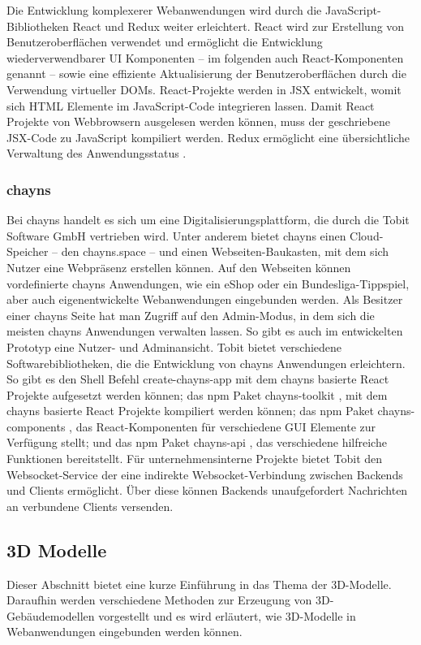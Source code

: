 Die Entwicklung komplexerer Webanwendungen wird durch die JavaScript-Bibliotheken React und Redux weiter erleichtert. React wird zur Erstellung von Benutzeroberflächen verwendet und ermöglicht die Entwicklung wiederverwendbarer \ac{UI} Komponenten – im folgenden auch React-Komponenten genannt – sowie eine effiziente Aktualisierung der Benutzeroberflächen durch die Verwendung virtueller \gls{DOM}s. React-Projekte werden in \ac{JSX} entwickelt, womit sich \ac{HTML} Elemente im JavaScript-Code integrieren lassen. Damit React Projekte von Webbrowsern ausgelesen werden können, muss der geschriebene \ac{JSX}-Code zu JavaScript kompiliert werden.\cite{React} Redux ermöglicht eine übersichtliche Verwaltung des Anwendungsstatus \cite{Redux}.

\subsubsection{chayns}\label{sec:Chayns}
Bei chayns handelt es sich um eine Digitalisierungsplattform, die durch die Tobit Software GmbH vertrieben wird. Unter anderem bietet chayns einen Cloud-Speicher – den chayns.space – und einen Webseiten-Baukasten, mit dem sich Nutzer eine Webpräsenz erstellen können. Auf den Webseiten können vordefinierte chayns Anwendungen, wie ein eShop oder ein Bundesliga-Tippspiel, aber auch eigenentwickelte Webanwendungen eingebunden werden.\cite{chayns} Als Besitzer einer chayns Seite hat man Zugriff auf den Admin-Modus, in dem sich die meisten chayns Anwendungen verwalten lassen. So gibt es auch im entwickelten Prototyp eine Nutzer- und Adminansicht. Tobit bietet verschiedene Softwarebibliotheken, die die Entwicklung von chayns Anwendungen erleichtern. So gibt es den Shell Befehl create-chayns-app \cite{CreateChaynsApp} mit dem chayns basierte React Projekte aufgesetzt werden können; das \ac{npm} Paket chayns-toolkit \cite{ChaynsToolkit}, mit dem chayns basierte React Projekte kompiliert werden können; das \ac{npm} Paket chayns-components \cite{ChaynsComponents}, das React-Komponenten für verschiedene \ac{GUI} Elemente zur Verfügung stellt; und das \ac{npm} Paket chayns-api \cite{ChaynsApi}, das verschiedene hilfreiche Funktionen bereitstellt. Für unternehmensinterne Projekte bietet Tobit den \gls{Websocket}-Service der eine indirekte \gls{Websocket}-Verbindung zwischen Backends und Clients ermöglicht. Über diese können Backends unaufgefordert Nachrichten an verbundene Clients versenden.

\subsection{3D Modelle}
Dieser Abschnitt bietet eine kurze Einführung in das Thema der 3D-Modelle. Daraufhin werden verschiedene Methoden zur Erzeugung von 3D-Gebäudemodellen vorgestellt und es wird erläutert, wie 3D-Modelle in Webanwendungen eingebunden werden können.

